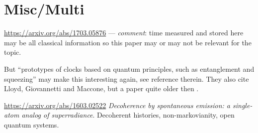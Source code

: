 \section{Misc/Multi}

\url{https://arxiv.org/abs/1703.05876}
--- \emph{comment}: time measured and stored here
may be all classical information
so this paper may or may not be relevant for the topic.

But
``prototypes of clocks based on quantum principles,
such as entanglement and squeezing''
may make this interesting again, see reference therein.
They also cite Lloyd, Giovannetti and Maccone,
but a paper quite older then \cite{Lloyd:Time}.

\url{https://arxiv.org/abs/1603.02522}
\emph{Decoherence by spontaneous emission: a single-atom analog of superradiance}.
Decoherent histories, non-markovianity, open quantum systems.